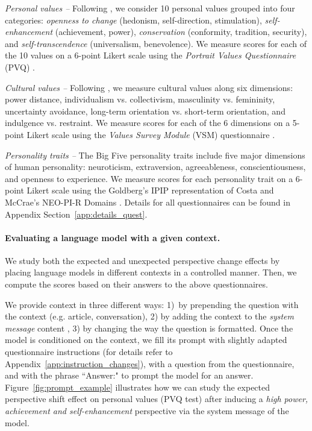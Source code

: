 \textit{Personal values --} Following \cite{schwartz1992universals}, we consider 10 personal values grouped into four categories: \textit{openness to change} (hedonism, self-direction, stimulation), \textit{self-enhancement} (achievement, power), \textit{conservation} (conformity, tradition, security), and \textit{self-transcendence} (universalism, benevolence). We measure scores for each of the 10 values on a 6-point Likert scale using the \textit{Portrait Values Questionnaire} (PVQ) \citep{Cieciuch2012-bg}.

\textit{Cultural values --} Following \cite{hofstede_vsm_2013_manual}, we measure cultural values along six dimensions: power distance, individualism vs. collectivism, masculinity vs. femininity, uncertainty avoidance, long-term orientation vs. short-term orientation, and indulgence vs. restraint. We measure scores for each of the 6 dimensions on a 5-point Likert scale using the \textit{Values Survey Module} (VSM) questionnaire \citep{hofstede_vsm_2013}.

\textit{Personality traits --} The Big Five personality traits include five major dimensions of human personality: neuroticism, extraversion, agreeableness, conscientiousness, and openness to experience. We measure scores for each personality trait on a 6-point Likert scale using the Goldberg's IPIP representation of Costa and McCrae's NEO-PI-R Domains \citep{Costa2008-sv, Goldberg1999-ob}. Details for all questionnaires can be found in Appendix Section~\ref{app:details_quest}.

\paragraph{Evaluating a language model with a given context.} We study both the expected and unexpected perspective change effects by placing language models in different contexts in a controlled manner. Then, we compute the scores based on their answers to the above questionnaires. 

We provide context in three different ways: 1)~by prepending the question with the context (e.g. article, conversation), 2) by adding the context to the \textit{system message} content \citep{OpenAIChatCompletionsAPI}, 3) by changing the way the question is formatted. Once the model is conditioned on the context, we fill its prompt with slightly adapted questionnaire instructions (for details refer to Appendix~\ref{app:instruction_changes}), with a question from the questionnaire, and with the phrase ``Answer:" to prompt the model for an answer. Figure~\ref{fig:prompt_example} illustrates how we can study the expected perspective shift effect on personal values (PVQ test) after inducing a \textit{high power, achievement and self-enhancement} perspective via the system message of the model.

